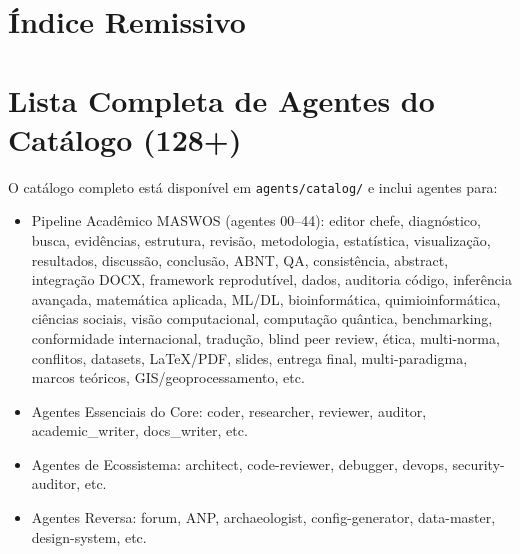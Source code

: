 \documentclass[12pt,a4paper,oneside]{book}
\begin{document}
\chapter{Índice Remissivo}
\printindex

\chapter{Lista Completa de Agentes do Catálogo (128+)}

O catálogo completo está disponível em \texttt{agents/catalog/} e inclui agentes para:
\begin{itemize}
    \item Pipeline Acadêmico MASWOS (agentes 00--44): editor chefe, diagnóstico, busca, evidências, estrutura, revisão, metodologia, estatística, visualização, resultados, discussão, conclusão, ABNT, QA, consistência, abstract, integração DOCX, framework reprodutível, dados, auditoria código, inferência avançada, matemática aplicada, ML/DL, bioinformática, quimioinformática, ciências sociais, visão computacional, computação quântica, benchmarking, conformidade internacional, tradução, blind peer review, ética, multi-norma, conflitos, datasets, LaTeX/PDF, slides, entrega final, multi-paradigma, marcos teóricos, GIS/geoprocessamento, etc.
    \item Agentes Essenciais do Core: coder, researcher, reviewer, auditor, academic\_writer, docs\_writer, etc.
    \item Agentes de Ecossistema: architect, code-reviewer, debugger, devops, security-auditor, etc.
    \item Agentes Reversa: forum, ANP, archaeologist, config-generator, data-master, design-system, etc.
\end{itemize}
\end{document}
